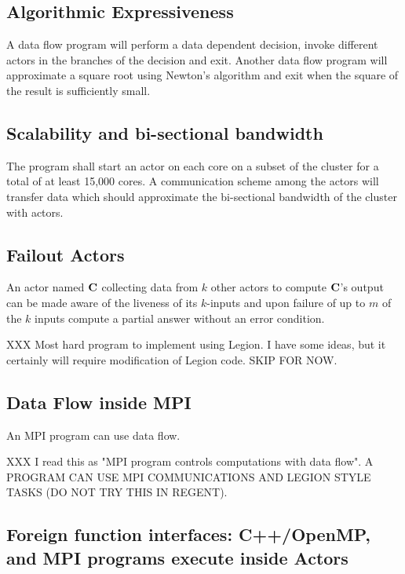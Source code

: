 \documentclass[11pt,a4paper]{article}
\begin{document}
\subsection{Algorithmic Expressiveness}

A data flow program will perform a data dependent decision, invoke different actors in the branches of the decision and exit.   Another data flow program will approximate a square root using Newton's algorithm and exit when the square of the result is sufficiently small.

\subsection{Scalability and bi-sectional bandwidth}

The program shall start an actor on each core on a subset of the cluster for a total of at least 15,000 cores.  A communication scheme among the actors will transfer data which should approximate the bi-sectional bandwidth of the cluster with actors.



\subsection{Failout Actors}

An actor named $\bf C$  collecting data from $k$ other actors to compute $\bf C$'s output can be made aware of the liveness of its $k$-inputs and upon failure of up to $m$ of the $k$ inputs compute a partial answer without an error condition.

XXX Most hard program to implement using Legion. I have some ideas, but it certainly will require modification of Legion code.  SKIP FOR NOW.

\subsection{Data Flow inside MPI}

An MPI program can use data flow.

XXX I read this as "MPI program controls computations with data flow".  A PROGRAM CAN USE MPI COMMUNICATIONS AND LEGION STYLE TASKS (DO NOT TRY THIS IN REGENT).

\subsection{Foreign function interfaces: C++/OpenMP, and MPI programs execute inside Actors} 
\end{document}
